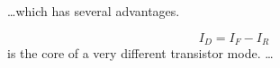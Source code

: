 \documentclass[a4paper, 11pt]{article}
\begin{document}
\ldots which has several advantages.

\begin{equation}
  I_D = I_F - I_R
\end{equation}
is the core of a very different transistor mode. \ldots
\end{document}
